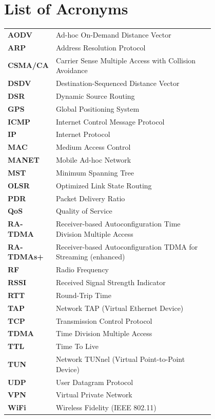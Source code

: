 \chapter*{List of Acronyms}
\begin{flushleft}
\begin{tabular}{l p{0.8\linewidth}}
\textbf{AODV}      & Ad-hoc On-Demand Distance Vector \\
\textbf{ARP}       & Address Resolution Protocol \\
\textbf{CSMA/CA}   & Carrier Sense Multiple Access with Collision Avoidance \\
\textbf{DSDV}      & Destination-Sequenced Distance Vector \\
\textbf{DSR}       & Dynamic Source Routing \\
\textbf{GPS}       & Global Positioning System \\
\textbf{ICMP}      & Internet Control Message Protocol \\
\textbf{IP}        & Internet Protocol \\
\textbf{MAC}       & Medium Access Control \\
\textbf{MANET}     & Mobile Ad-hoc Network \\
\textbf{MST}       & Minimum Spanning Tree \\
\textbf{OLSR}      & Optimized Link State Routing \\
\textbf{PDR}       & Packet Delivery Ratio \\
\textbf{QoS}       & Quality of Service \\
\textbf{RA-TDMA}   & Receiver-based Autoconfiguration Time Division Multiple Access \\
\textbf{RA-TDMAs+} & Receiver-based Autoconfiguration TDMA for Streaming (enhanced) \\
\textbf{RF}        & Radio Frequency \\
\textbf{RSSI}      & Received Signal Strength Indicator \\
\textbf{RTT}       & Round-Trip Time \\
\textbf{TAP}       & Network TAP (Virtual Ethernet Device) \\
\textbf{TCP}       & Transmission Control Protocol \\
\textbf{TDMA}      & Time Division Multiple Access \\
\textbf{TTL}       & Time To Live \\
\textbf{TUN}       & Network TUNnel (Virtual Point-to-Point Device) \\
\textbf{UDP}       & User Datagram Protocol \\
\textbf{VPN}       & Virtual Private Network \\
\textbf{WiFi}      & Wireless Fidelity (IEEE 802.11) \\
\end{tabular}
\end{flushleft}
